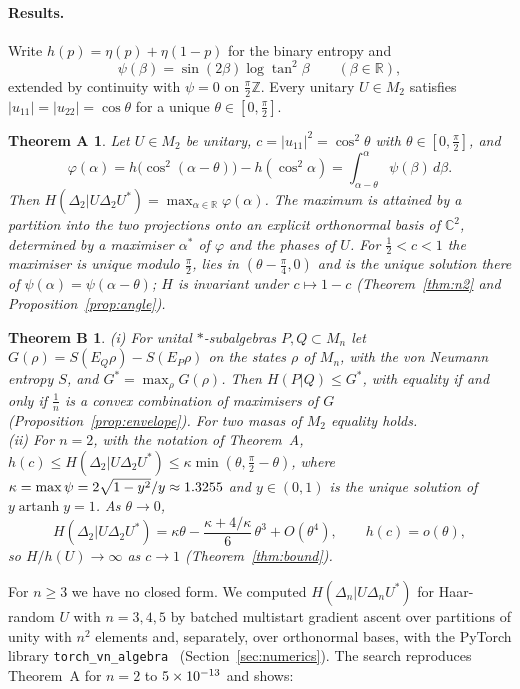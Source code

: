\documentclass[11pt]{article}
\DeclareMathOperator{\artanh}{artanh}
\newcommand{\C}{\mathbb{C}}
\newcommand{\R}{\mathbb{R}}
\newcommand{\Z}{\mathbb{Z}}
\theoremstyle{plain}
\newtheorem*{thmA}{Theorem A}
\newtheorem*{thmB}{Theorem B}
\theoremstyle{definition}
\theoremstyle{remark}
\begin{document}
\paragraph{Results.} Write $h(p)=\eta(p)+\eta(1-p)$ for the binary entropy and
\begin{equation}\label{eq:psi}
  \psi(\beta)=\sin(2\beta)\log\tan^2\beta\qquad(\beta\in\R),
\end{equation}
extended by continuity with $\psi=0$ on $\frac\pi2\Z$. Every unitary $U\in M_2$ satisfies $|u_{11}|=|u_{22}|=\cos\theta$ for
a unique $\theta\in[0,\frac\pi2]$.

\begin{thmA}
Let $U\in M_2$ be unitary, $c=|u_{11}|^2=\cos^2\theta$ with $\theta\in[0,\frac\pi2]$, and
\[
  \varphi(\alpha)=h\bigl(\cos^2(\alpha-\theta)\bigr)-h(\cos^2\alpha)=\int_{\alpha-\theta}^{\alpha}\psi(\beta)\,d\beta .
\]
Then $H(\Delta_2|U\Delta_2U^*)=\max_{\alpha\in\R}\varphi(\alpha)$. The maximum is attained by a partition into the two
projections onto an explicit orthonormal basis of $\C^2$, determined by a maximiser $\alpha^*$ of $\varphi$ and the phases
of $U$. For $\frac12<c<1$ the maximiser is unique modulo $\frac\pi2$, lies in $(\theta-\frac\pi4,0)$ and is the unique
solution there of $\psi(\alpha)=\psi(\alpha-\theta)$; $H$ is invariant under $c\mapsto1-c$
(Theorem~\ref{thm:n2} and Proposition~\ref{prop:angle}).
\end{thmA}

\begin{thmB}
(i) For unital $*$-subalgebras $P,Q\subset M_n$ let $G(\rho)=S(E_Q\rho)-S(E_P\rho)$ on the states $\rho$ of $M_n$, with the
von Neumann entropy $S$, and $G^*=\max_\rho G(\rho)$. Then $H(P|Q)\le G^*$, with equality if and only if $\frac1n$ is a
convex combination of maximisers of $G$ (Proposition~\ref{prop:envelope}). For two masas of $M_2$ equality holds.\\
(ii) For $n=2$, with the notation of Theorem~A, $h(c)\le H(\Delta_2|U\Delta_2U^*)\le\kappa\min(\theta,\frac\pi2-\theta)$, where
$\kappa=\max\psi=2\sqrt{1-y^2}/y\approx1.3255$ and $y\in(0,1)$ is the unique solution of $y\artanh y=1$. As $\theta\to0$,
\[
  H(\Delta_2|U\Delta_2U^*)=\kappa\theta-\frac{\kappa+4/\kappa}{6}\,\theta^3+O(\theta^4),\qquad h(c)=o(\theta),
\]
so $H/h(U)\to\infty$ as $c\to1$ (Theorem~\ref{thm:bound}).
\end{thmB}

For $n\ge3$ we have no closed form. We computed $H(\Delta_n|U\Delta_nU^*)$ for Haar-random $U$ with $n=3,4,5$ by
batched multistart gradient ascent over partitions of unity with $n^2$ elements and, separately, over orthonormal bases,
with the PyTorch library \texttt{torch\_\allowbreak vn\_\allowbreak algebra}~\cite{lib} (Section~\ref{sec:numerics}). The
search reproduces Theorem~A for $n=2$ to $5\times10^{-13}$ and shows:
\end{document}
